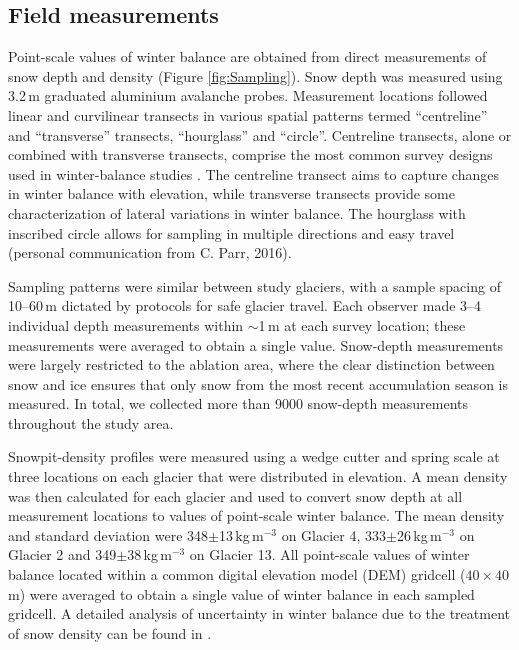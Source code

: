 \documentclass[twocolumn,letterpaper]{igs}
\begin{document}
\subsection{Field measurements}

Point-scale values of winter balance are obtained from direct measurements of snow depth and density (Figure \ref{fig:Sampling}). Snow depth was measured using  3.2\,m graduated aluminium avalanche probes. Measurement locations followed linear and curvilinear transects in various spatial patterns termed ``centreline'' and ``transverse'' transects, ``hourglass'' and ``circle''. 
Centreline transects, alone or combined with transverse transects, comprise the most common survey designs used in winter-balance studies \citep[e.g.][]{Kaser2002, Machguth2006}. The centreline transect aims to capture changes in winter balance with elevation, while transverse transects provide some characterization of lateral variations in winter balance. The hourglass with inscribed circle allows for sampling in multiple directions and easy travel (personal communication from C. Parr, 2016). 

Sampling patterns were similar between study glaciers, with a sample spacing of 10--60\,m dictated by protocols for safe glacier travel. Each observer made 3--4 individual depth measurements within $\sim$1\,m at each survey location; these measurements were averaged to obtain a single value. Snow-depth measurements were largely restricted to the ablation area, where the clear distinction between snow and ice ensures that only snow from the most recent accumulation season is measured. In total, we collected more than 9000 snow-depth measurements throughout the study area. 

Snowpit-density profiles were measured using a wedge cutter and spring scale at three locations on each glacier that were distributed in elevation. A mean density was then calculated for each glacier and used to convert snow depth at all measurement locations to values of point-scale winter balance. The mean density and standard deviation were 348$\pm$13\,kg\,m$^{-3}$ on Glacier 4, 333$\pm$26\,kg\,m$^{-3}$ on Glacier 2 and 349$\pm$38\,kg\,m$^{-3}$ on Glacier 13. All point-scale values of winter balance located within a common digital elevation model (DEM) gridcell ($40\times40$\,m) were averaged to obtain a single value of winter balance in each sampled gridcell. A detailed analysis of uncertainty in winter balance due to the treatment of snow density can be found in \cite{Pulwicki2017}.
\end{document}
